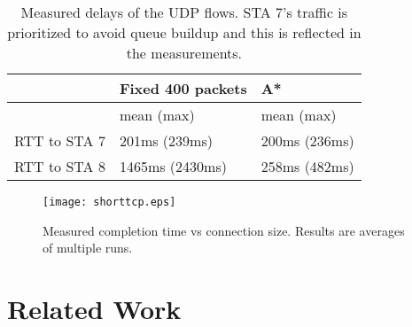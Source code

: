 \documentclass[10pt,twocolumn, journal]{IEEEtran}
\begin{document}
\begin{table}[tb]
\centering
    \begin{footnotesize}
            \begin{tabular}{|l|l|l|}
            \hline
                           & \textbf{Fixed 400 packets}    & \textbf{A*}  \\
            \hline
                           & mean (max)                 & mean (max)   \\
            \hline
            RTT to STA 7   & 201ms (239ms)              & 200ms (236ms)  \\
            \hline
            RTT to STA 8   & 1465ms  (2430ms)           & 258ms  (482ms) \\
            \hline
            \end{tabular}
            \caption{Measured delays of the UDP flows. STA 7's traffic is prioritized to avoid queue buildup and this is reflected in the measurements.}
            \label{tab_delay}
    \end{footnotesize}


\end{table}

\begin{figure}[tb]
    \centering
    \texttt{[image: shorttcp.eps]}
    \caption{Measured completion time vs connection size. Results are averages of multiple runs.}
    \label{fig_motivation_short}
\end{figure}




\section{Related Work}\label{sec_related_work}
\end{document}
